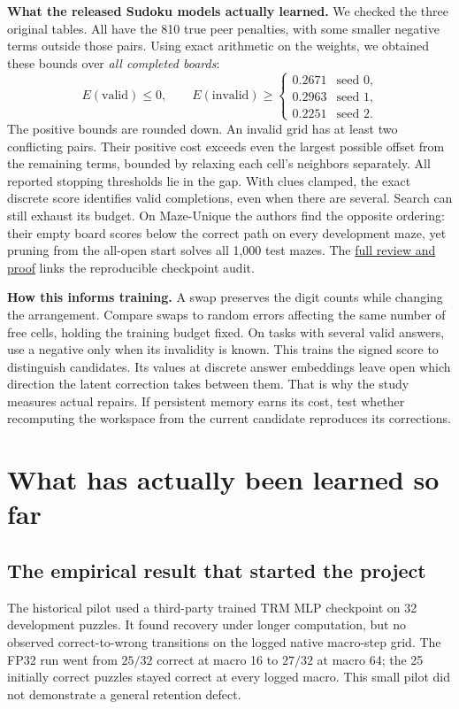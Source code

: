 \documentclass[11pt,a4paper]{article}
\newcommand{\repo}[2]{\href{https://github.com/NiccoGrillo/TinyRecursiveModels/blob/main/#1}{#2}}
\newcommand{\newtopic}{\clearpage}
\begin{document}
\textbf{What the released Sudoku models actually learned.} We checked the three original tables. All have the 810 true peer penalties, with some smaller negative terms outside those pairs. Using exact arithmetic on the weights, we obtained these bounds over \emph{all completed boards}:
\[
  E(\text{valid})\le0,\qquad
  E(\text{invalid})\ge
  \begin{cases}
      0.2671 & \text{seed 0},\\
      0.2963 & \text{seed 1},\\
      0.2251 & \text{seed 2}.
  \end{cases}
\]
The positive bounds are rounded down. An invalid grid has at least two conflicting pairs. Their positive cost exceeds even the largest possible offset from the remaining terms, bounded by relaxing each cell's neighbors separately. All reported stopping thresholds lie in the gap. With clues clamped, the exact discrete score identifies valid completions, even when there are several. Search can still exhaust its budget. On Maze-Unique the authors find the opposite ordering: their empty board scores below the correct path on every development maze, yet pruning from the all-open start solves all 1,000 test mazes. The \repo{docs/CRAM_REVIEW.md}{full review and proof} links the reproducible checkpoint audit.

\textbf{How this informs training.} A swap preserves the digit counts while changing the arrangement. Compare swaps to random errors affecting the same number of free cells, holding the training budget fixed. On tasks with several valid answers, use a negative only when its invalidity is known. This trains the signed score to distinguish candidates. Its values at discrete answer embeddings leave open which direction the latent correction takes between them. That is why the study measures actual repairs. If persistent memory earns its cost, test whether recomputing the workspace from the current candidate reproduces its corrections.

\newtopic
\section{What has actually been learned so far}\label{sec:evidence}
\subsection{The empirical result that started the project}
The historical pilot used a third-party trained TRM MLP checkpoint on 32 development puzzles. It found recovery under longer computation, but no observed correct-to-wrong transitions on the logged native macro-step grid. The FP32 run went from $25/32$ correct at macro 16 to $27/32$ at macro 64; the 25 initially correct puzzles stayed correct at every logged macro. This small pilot did not demonstrate a general retention defect.
\end{document}
